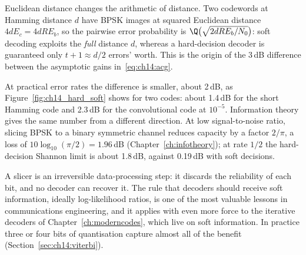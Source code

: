 
Euclidean distance changes the arithmetic of distance. Two codewords at Hamming distance $d$ have
BPSK images at squared Euclidean distance $4dE_c=4dRE_b$, so the pairwise error probability is
$\Q\big(\sqrt{2dRE_b/N_0}\big)$: soft decoding exploits the \emph{full} distance $d$, whereas a
hard-decision decoder is guaranteed only $t+1\approx d/2$ errors' worth. This is the origin of the
3\,dB difference between the asymptotic gains in~\eqref{eq:ch14:acg}.

At practical error rates the difference is smaller, about 2\,dB, as Figure~\ref{fig:ch14_hard_soft}
shows for two codes: about 1.4\,dB for the short Hamming code and 2.3\,dB for the convolutional
code at $10^{-5}$. Information theory gives the same number from a different direction. At low
signal-to-noise ratio, slicing BPSK to a binary symmetric channel reduces capacity by a factor
$2/\pi$, a loss of $10\log_{10}(\pi/2)=1.96$\,dB (Chapter~\ref{ch:infotheory}); at rate $1/2$ the
hard-decision Shannon limit is about 1.8\,dB, against 0.19\,dB with soft decisions.


\begin{keyidea}
A slicer is an irreversible data-processing step: it discards the reliability of each bit, and
no decoder can recover it. The rule that decoders should receive soft information, ideally
log-likelihood ratios, is one of the most valuable lessons in communications engineering, and it
applies with even more force to the iterative decoders of Chapter~\ref{ch:moderncodes}, which live
on soft information. In practice three or four bits of quantisation capture almost all of the
benefit (Section~\ref{sec:ch14:viterbi}).
\end{keyidea}

